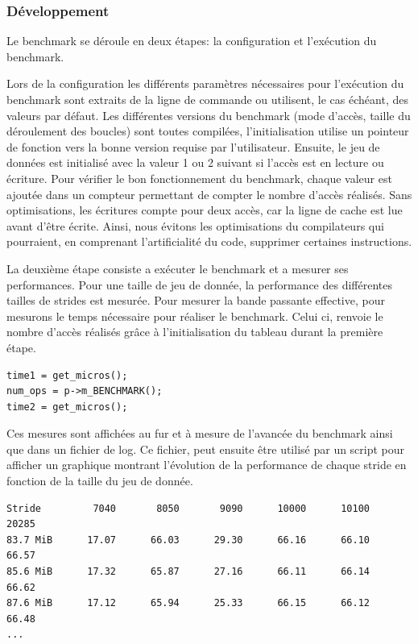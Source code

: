        

    
    \subsubsection{Développement}

        Le benchmark se déroule en deux étapes: la configuration et l'exécution du benchmark.
        
            Lors de la configuration les différents paramètres nécessaires pour l'exécution du benchmark sont extraits de la ligne de commande ou utilisent, le cas échéant, des valeurs par défaut. Les différentes versions du benchmark (mode d'accès, taille du déroulement des boucles) sont toutes compilées, l'initialisation utilise un pointeur de fonction vers la bonne version requise par l'utilisateur. Ensuite, le jeu de données est initialisé avec la valeur 1 ou 2 suivant si l'accès est en lecture ou écriture. Pour vérifier le bon fonctionnement du benchmark, chaque valeur est ajoutée dans un compteur permettant de compter le nombre d'accès réalisés. Sans optimisations, les écritures compte pour deux accès, car la ligne de cache est lue avant d'être écrite. Ainsi, nous évitons les optimisations du compilateurs qui pourraient, en comprenant l'artificialité du code, supprimer certaines instructions. 
            
            La deuxième étape consiste a exécuter le benchmark et a mesurer ses performances. Pour une taille de jeu de donnée, la performance des différentes tailles de strides est mesurée. Pour mesurer la bande passante effective, pour mesurons le temps nécessaire pour réaliser le benchmark. Celui ci, renvoie le nombre d'accès réalisés grâce à l'initialisation du tableau durant la première étape. 
            \begin{verbatim}
time1 = get_micros();
num_ops = p->m_BENCHMARK();
time2 = get_micros();
            \end{verbatim}
            
            Ces mesures sont affichées au fur et à mesure de l'avancée du benchmark ainsi que dans un fichier de log. Ce fichier, peut ensuite être utilisé par un script pour afficher un graphique montrant l'évolution de la performance de chaque stride en fonction de la taille du jeu de donnée. 
            
            \begin{verbatim}
Stride         7040       8050       9090      10000      10100      20285
83.7 MiB      17.07      66.03      29.30      66.16      66.10      66.57
85.6 MiB      17.32      65.87      27.16      66.11      66.14      66.62
87.6 MiB      17.12      65.94      25.33      66.15      66.12      66.48
...
            \end{verbatim}

